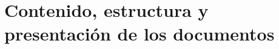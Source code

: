 {%
\section[Contenido, estructura y presentación]{Contenido, estructura y presentación de los documentos} \label{ss:separac} 

}
